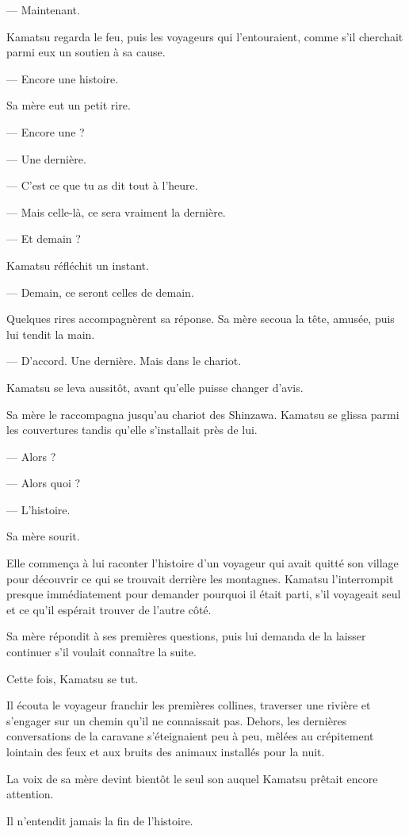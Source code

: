 — Maintenant.

Kamatsu regarda le feu, puis les voyageurs qui l'entouraient, comme s'il
cherchait parmi eux un soutien à sa cause.

— Encore une histoire.

Sa mère eut un petit rire.

— Encore une ?

— Une dernière.

— C'est ce que tu as dit tout à l'heure.

— Mais celle-là, ce sera vraiment la dernière.

— Et demain ?

Kamatsu réfléchit un instant.

— Demain, ce seront celles de demain.

Quelques rires accompagnèrent sa réponse. Sa mère secoua la tête, amusée, puis
lui tendit la main.

— D'accord. Une dernière. Mais dans le chariot.

Kamatsu se leva aussitôt, avant qu'elle puisse changer d'avis.

\scenebreak

Sa mère le raccompagna jusqu'au chariot des Shinzawa. Kamatsu se glissa parmi
les couvertures tandis qu'elle s'installait près de lui.

— Alors ?

— Alors quoi ?

— L'histoire.

Sa mère sourit.

Elle commença à lui raconter l'histoire d'un voyageur qui avait quitté son
village pour découvrir ce qui se trouvait derrière les montagnes. Kamatsu
l'interrompit presque immédiatement pour demander pourquoi il était parti,
s'il voyageait seul et ce qu'il espérait trouver de l'autre côté.

Sa mère répondit à ses premières questions, puis lui demanda de la laisser
continuer s'il voulait connaître la suite.

Cette fois, Kamatsu se tut.

Il écouta le voyageur franchir les premières collines, traverser une rivière et
s'engager sur un chemin qu'il ne connaissait pas. Dehors, les dernières
conversations de la caravane s'éteignaient peu à peu, mêlées au crépitement
lointain des feux et aux bruits des animaux installés pour la nuit.

La voix de sa mère devint bientôt le seul son auquel Kamatsu prêtait encore
attention.

Il n'entendit jamais la fin de l'histoire.